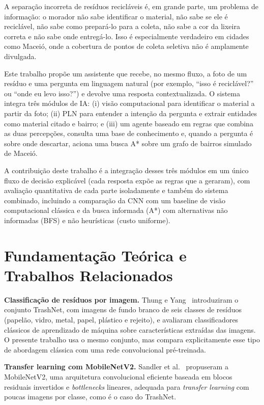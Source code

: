 \documentclass[conference]{IEEEtran}
\begin{document}
A separação incorreta de resíduos recicláveis é, em grande parte, um problema de informação:
o morador não sabe identificar o material, não sabe se ele é reciclável, não sabe como
prepará-lo para a coleta, não sabe a cor da lixeira correta e não sabe onde entregá-lo. Isso é
especialmente verdadeiro em cidades como Maceió, onde a cobertura de pontos de coleta
seletiva não é amplamente divulgada.

Este trabalho propõe um assistente que recebe, no mesmo fluxo, a foto de um resíduo e uma
pergunta em linguagem natural (por exemplo, ``isso é reciclável?'' ou ``onde eu levo isso?'')
e devolve uma resposta contextualizada. O sistema integra três módulos de IA: (i) visão
computacional para identificar o material a partir da foto; (ii) PLN para entender a intenção
da pergunta e extrair entidades como material citado e bairro; e (iii) um agente baseado em
regras que combina as duas percepções, consulta uma base de conhecimento e, quando a
pergunta é sobre onde descartar, aciona uma busca A* sobre um grafo de bairros simulado de
Maceió.

A contribuição deste trabalho é a integração desses três módulos em um único fluxo de decisão
explicável (cada resposta expõe as regras que a geraram), com avaliação quantitativa de cada
parte isoladamente e também do sistema combinado, incluindo a comparação da CNN com um
baseline de visão computacional clássica e da busca informada (A*) com alternativas não
informadas (BFS) e não heurísticas (custo uniforme).

\section{Fundamentação Teórica e Trabalhos Relacionados}

\textbf{Classificação de resíduos por imagem.} Thung e Yang~\cite{thung2016trashnet}
introduziram o conjunto TrashNet, com imagens de fundo branco de seis classes de resíduos
(papelão, vidro, metal, papel, plástico e rejeito), e avaliaram classificadores clássicos de
aprendizado de máquina sobre características extraídas das imagens. O presente trabalho usa o
mesmo conjunto, mas compara explicitamente esse tipo de abordagem clássica com uma rede
convolucional pré-treinada.

\textbf{Transfer learning com MobileNetV2.} Sandler et al.~\cite{sandler2018mobilenetv2}
propuseram a MobileNetV2, uma arquitetura convolucional eficiente baseada em blocos
residuais invertidos e \textit{bottlenecks} lineares, adequada para \textit{transfer
learning} com poucas imagens por classe, como é o caso do TrashNet.
\end{document}
